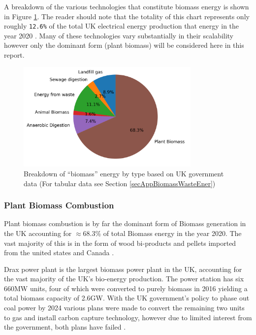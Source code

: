 \documentclass[11pt]{article}
\numberwithin{equation}{section}
\begin{document}
A breakdown of the various technologies that constitute biomass energy is shown in Figure \ref{figPie2020BiomassBreakdown}. The reader should note that the totality of this chart represents only roughly \texttt{12.6\%} of the total UK electrical energy production that energy in the year 2020 \cite{BiomassPolicyStatement}. Many of these technologies vary substantially in their scalability however only the dominant form (plant biomass) will be considered here in this report.

\begin{figure}[H]
\centering
\includegraphics[width=0.8\textwidth]{./.ob-jupyter/7fa8fd63b7c93210e8cc642d47606e1527c98a39.png}
\caption{\label{figPie2020BiomassBreakdown}Breakdown of ``biomass'' energy by type based on UK government data \cite{RenewableElecricityCap} (For tabular data see Section \ref{secAppBiomassWasteEner})}
\end{figure}

\subsubsection{Plant Biomass Combustion}
\label{sec:org8130950}
Plant biomass combustion is by far the dominant form of Biomass generation in the UK accounting for \(\approx\)68.3\% of total Biomass energy in the year 2020. The vast majority of this is in the form of wood bi-products and pellets imported from the united states and Canada \cite{BiomassPolicyStatement}.

Drax power plant is the largest biomass power plant in the UK, accounting for the vast majority of the UK's bio-energy production. The power station has six 660MW units, four of which were converted to purely biomass in 2016 yielding a total biomass capacity of 2.6GW. With the UK government's policy to phase out coal power by 2024 various plans were made to convert the remaining two units to gas and install carbon capture technology, however due to limited interest from the government, both plans have failed \cite{EndtoCoal2024}.
\end{document}

